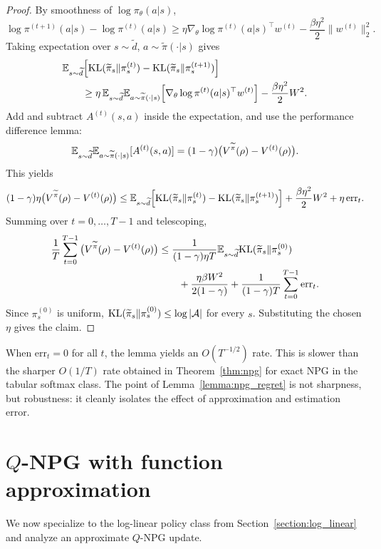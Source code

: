 \begin{proof}
By smoothness of $\log \pi_\theta(a|s)$,
\[
\log \pi^{(t+1)}(a|s)-\log \pi^{(t)}(a|s)
\ge
\eta \nabla_\theta \log \pi^{(t)}(a|s)^\top w^{(t)}
-
\frac{\beta \eta^2}{2}\|w^{(t)}\|_2^2.
\]
Taking expectation over $s\sim \widetilde d$, $a\sim \widetilde\pi(\cdot|s)$ gives
\begin{align*}
&\mathbb{E}_{s\sim \widetilde d}
\Big[
\mathrm{KL}(\widetilde\pi_s\|\pi^{(t)}_s)-\mathrm{KL}(\widetilde\pi_s\|\pi^{(t+1)}_s)
\Big] \\
&\qquad \ge
\eta\,
\mathbb{E}_{s\sim \widetilde d}
\mathbb{E}_{a\sim \widetilde\pi(\cdot|s)}
\Big[
\nabla_\theta \log \pi^{(t)}(a|s)^\top w^{(t)}
\Big]
-
\frac{\beta\eta^2}{2}W^2.
\end{align*}
Add and subtract $A^{(t)}(s,a)$ inside the expectation, and use the performance
difference lemma:
\[
\mathbb{E}_{s\sim \widetilde d}
\mathbb{E}_{a\sim \widetilde\pi(\cdot|s)}
[A^{(t)}(s,a)]
=
(1-\gamma)\big(V^{\widetilde \pi}(\rho)-V^{(t)}(\rho)\big).
\]
This yields
\[
(1-\gamma)\eta\big(V^{\widetilde \pi}(\rho)-V^{(t)}(\rho)\big)
\le
\mathbb{E}_{s\sim \widetilde d}
\Big[
\mathrm{KL}(\widetilde\pi_s\|\pi^{(t)}_s)-\mathrm{KL}(\widetilde\pi_s\|\pi^{(t+1)}_s)
\Big]
+
\frac{\beta\eta^2}{2}W^2
+
\eta\,\mathrm{err}_t.
\]
Summing over $t=0,\dots,T-1$ and telescoping,
\begin{align*}
\frac{1}{T}\sum_{t=0}^{T-1}\big(V^{\widetilde \pi}(\rho)-V^{(t)}(\rho)\big)
&\le
\frac{1}{(1-\gamma)\eta T}
\mathbb{E}_{s\sim \widetilde d}\mathrm{KL}(\widetilde\pi_s\|\pi^{(0)}_s) \\
&\qquad +
\frac{\eta\beta W^2}{2(1-\gamma)}
+
\frac{1}{(1-\gamma)T}\sum_{t=0}^{T-1}\mathrm{err}_t.
\end{align*}
Since $\pi^{(0)}_s$ is uniform, $\mathrm{KL}(\widetilde\pi_s\|\pi^{(0)}_s)\le \log |\mathcal{A}|$ for every $s$.
Substituting the chosen $\eta$ gives the claim.
\end{proof}

When $\mathrm{err}_t=0$ for all $t$, the lemma yields an $O(T^{-1/2})$ rate.
This is slower than the sharper $O(1/T)$ rate obtained in Theorem~\ref{thm:npg}
for exact NPG in the tabular softmax class. The point of
Lemma~\ref{lemma:npg_regret} is not sharpness, but robustness:
it cleanly isolates the effect of approximation and estimation error.

\section{$Q$-NPG with function approximation}
\label{sec:q-npg}

We now specialize to the log-linear policy class from Section~\ref{section:log_linear} and
analyze an approximate $Q$-NPG update.

